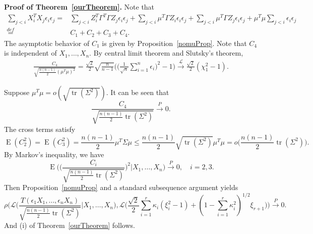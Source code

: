 \documentclass[3p]{elsarticle}
\DeclareMathOperator{\mytr}{tr}
\DeclareMathOperator{\myE}{E}
\theoremstyle{plain}
\theoremstyle{definition}
\theoremstyle{remark}
\begin{document}
\textbf{Proof of Theorem~\ref{ourTheorem}. }
Note that
    \begin{equation*}
        \begin{aligned}
            \sum_{j<i} X_i^T X_j \epsilon_i\epsilon_j
            =&
            \sum_{j<i} Z_i^T \Gamma^T \Gamma Z_j \epsilon_i\epsilon_j
            +
            \sum_{j<i} \mu^T \Gamma Z_i \epsilon_i\epsilon_j
            +\sum_{j<i} \mu^T \Gamma Z_j \epsilon_i\epsilon_j+
            \mu^T \mu \sum_{j<i} \epsilon_i\epsilon_j\\
            \overset{def}{=}&C_1+C_2+C_3+C_4.
        \end{aligned}
    \end{equation*}
    The asymptotic behavior of $C_1$ is given by Proposition~\ref{nomuProp}.
    Note that $C_4$ is independent of $X_1,\ldots,X_n$.
    By central limit theorem and Slutsky's theorem,
    \begin{equation*}
        \begin{aligned}
            \frac{C_4}
            {\sqrt{\frac{n(n-1)}{2}(\mu^T\mu)^2}}
            =\frac{\sqrt{2}}{2}\sqrt{\frac{n}{n-1}}\Big(\big(\frac{1}{\sqrt{n}}\sum_{i=1}^n \epsilon_i\big)^2-1\Big)\xrightarrow{\mathcal{L}}\frac{\sqrt{2}}{2}(\chi^2_1-1).
        \end{aligned}
    \end{equation*}

    Suppose $\mu^T \mu=o(\sqrt{\mytr(\Sigma^2)})$. It can be seen that 
    $$
        \frac{C_4}{\sqrt{\frac{n(n-1)}{2}\mytr(\Sigma^2)}}
        \xrightarrow{P} 0.
    $$
    The cross terms satisfy
    \begin{equation*}
    \myE(C_2^2)=\myE(C_3^2)=\frac{n(n-1)}{2}\mu^T \Sigma \mu
        \leq \frac{n(n-1)}{2}\sqrt{\mytr (\Sigma^2)}\mu^T\mu
        = o\Big(\frac{n(n-1)}{2}\mytr (\Sigma^2)\Big).
    \end{equation*}
    By Markov's inequality, we have
    \begin{equation*}
        \myE\Bigg(\bigg(\frac{C_i}{\sqrt{\frac{n(n-1)}{2}\mytr(\Sigma^2)}}
        \bigg)^2\Bigg|X_1,\ldots,X_n\Bigg)\xrightarrow{P} 0,\quad i=2,3.
    \end{equation*}
    Then Proposition~\ref{nomuProp} and a standard subsequence argument yields
    $$
            \rho\Bigg(\mathcal{L}\bigg(\frac{T(\epsilon_1 X_1,\ldots, \epsilon_n X_n)}{\sqrt{\frac{n(n-1)}{2}\mytr(\Sigma^2)}}\bigg| X_1,\ldots,X_n\bigg)
            ,
            \mathcal{L}\big(\frac{\sqrt{2}}{2}\sum_{i=1}^r \kappa_i (\xi_i^2-1)+(1-\sum_{i=1}^r \kappa_i^2)^{1/2} \xi_{r+1}\big)
            \Bigg)\xrightarrow{P}0.
    $$
And (i) of Theorem~\ref{ourTheorem} follows.
\end{document}
